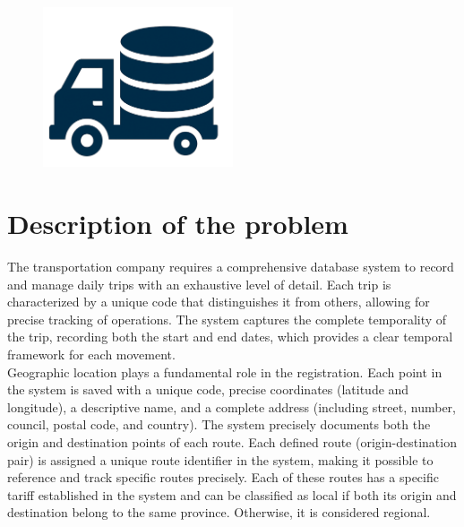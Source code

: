 \documentclass[11pt, a4paper]{article}
\title{\normalfont\spacedallcaps{Database design for transportation company}}
\author{\spacedlowsmallcaps{CarlosFOL}}
\date{}
\begin{document}

\maketitle



\tableofcontents

\vspace{2in}

\begin{figure}[h!]
    \centering
    \includegraphics[width=0.5\textwidth]{img/logo.png}
    \label{logo_db}
\end{figure}


\newpage


\section{Description of the problem}


The transportation company requires a comprehensive database system to record and manage daily trips with an exhaustive level of detail. Each trip is characterized by a unique code that distinguishes it from others, allowing for precise tracking of operations. The system captures the complete temporality of the trip, recording both the start and end dates, which provides a clear temporal framework for each movement.\\

Geographic location plays a fundamental role in the registration. Each point in the system is saved with a unique code, precise coordinates (latitude and longitude), a descriptive name, and a complete address (including street, number, council, postal code, and country). The system precisely documents both the origin and destination points of each route. Each defined route (origin-destination pair) is assigned a unique route identifier in the system, making it possible to reference and track specific routes precisely. Each of these routes has a specific tariff established in the system and can be classified as local if both its origin and destination belong to the same province. Otherwise, it is considered regional.\\
\end{document}
